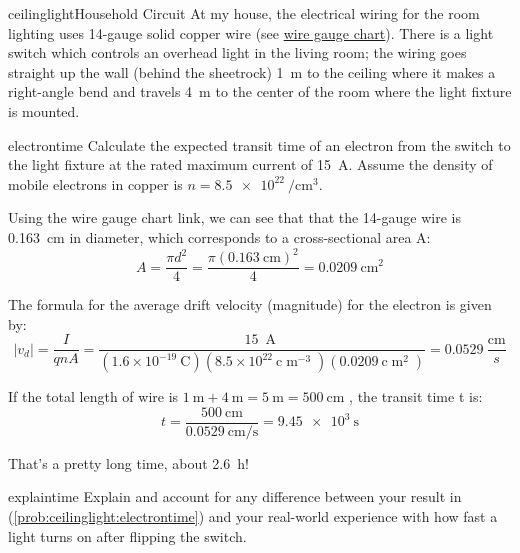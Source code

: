 \begin{mainquestion}{ceilinglight}{Household Circuit}
At my house, the electrical wiring for the room lighting uses 14-gauge solid copper wire (see \href{https://www.engineeringtoolbox.com/awg-wire-gauge-d_731.html}{wire gauge chart}). There is a light switch which controls an overhead light in the living room; the wiring goes straight up the wall (behind the sheetrock) \qty{1}{\meter} to the ceiling where it makes a right-angle bend and travels \qty{4}{\meter} to the center of the room where the light fixture is mounted.

\begin{partquestion}{electrontime}
{Calculate the expected transit time of an electron from the switch to the light fixture at the rated maximum current of \qty{15}{\ampere}. Assume the density of mobile electrons in copper is $n = \qty{8.5e22}{\per\centi\meter\cubed}$.}

\begin{answer}
Using the wire gauge chart link, we can see that that the 14-gauge wire is \qty{0.163}{\centi\meter} in diameter, which corresponds to a cross-sectional area A: 
\[
A = \frac{\pi d^2}{4}
  = \frac{\pi (\qty{0.163}{\centi\meter})^2}{4}
  = \qty{0.0209}{\centi\meter\squared}
\]

The formula for the average drift velocity (magnitude) for the electron is given by:
\[
\left|v_d\right|=\frac{I}{qnA}=\frac{15\mathrm{\ \operatorname{A}} }{\left(1.6\times10^{-19}\mathrm{\ C} \right)\left(8.5\times10^{22}\mathrm{\ c} \mathrm{\operatorname{m}}^{-3}\right)\left(0.0209\mathrm{\ c}\mathrm{\operatorname{m}}^2\right)}=0.0529\ \frac{\mathrm{cm} }{s}
\]

If the total length of wire is $\qty{1}{\meter} + \qty{4}{\meter} = \qty{5}{\meter} = \qty{500}{\centi\meter}$ , the transit time t is:
\[
t = \frac{\qty{500}{\centi\meter}}{\qty{0.0529}{\centi\meter\per\second}}
  = \qty{9.45e3}{\second}
\]

That's a pretty long time, about \qty{2.6}{\hour}!
\end{answer}
\end{partquestion}

\begin{partquestion}{explaintime}
{Explain and account for any difference between your result in (\cref{prob:ceilinglight:electrontime}) and your real-world experience with how fast a light turns on after flipping the switch.}


\end{partquestion}
\end{mainquestion}
